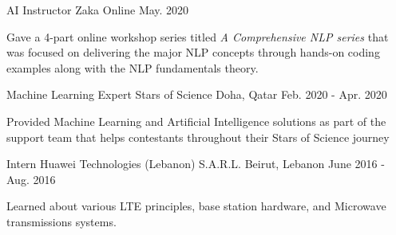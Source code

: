 \begin{cventries}
    \cventry
    {AI Instructor} %
    {Zaka} %
    {Online} %
    {May. 2020} %
    { 
      \begin{cvitems} %
        \item {Gave a 4-part online workshop series titled \textit{A Comprehensive NLP series} that was focused on delivering the major NLP concepts through hands-on coding examples along with the NLP fundamentals theory.} 
      \end{cvitems}
    }
  \cventry
    {Machine Learning Expert} %
    {Stars of Science} %
    {Doha, Qatar} %
    {Feb. 2020 - Apr. 2020} %
    { 
      \begin{cvitems} %
        \item {Provided Machine Learning and Artificial Intelligence solutions as part of the support team that helps contestants throughout their Stars of Science journey}
      \end{cvitems}
    }
 \newline
  \newline
  \cventry
    {Intern} %
    {Huawei Technologies (Lebanon) S.A.R.L.} %
    {Beirut, Lebanon} %
    {June 2016  - Aug. 2016} %
    {
      \begin{cvitems} %
        \item {Learned about various LTE principles, base station hardware, and Microwave transmissions systems.}
      \end{cvitems}
    }

\end{cventries}
